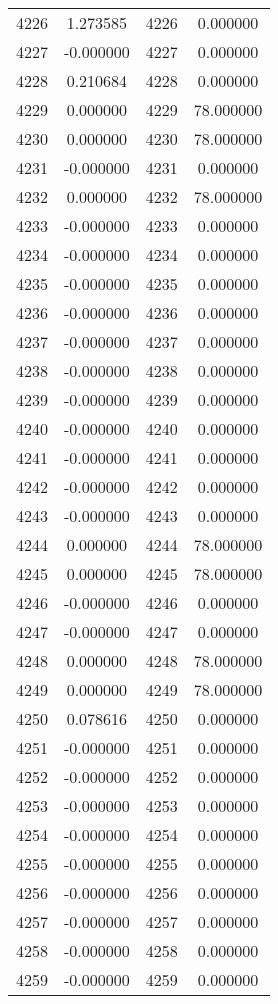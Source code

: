 \documentclass[12pt]{article}
\begin{document}
\begin{longtable}{@{}cccc@{}}
4226 & 1.273585 & 4226 & 0.000000 \\
4227 & -0.000000 & 4227 & 0.000000 \\
4228 & 0.210684 & 4228 & 0.000000 \\
4229 & 0.000000 & 4229 & 78.000000 \\
4230 & 0.000000 & 4230 & 78.000000 \\
4231 & -0.000000 & 4231 & 0.000000 \\
4232 & 0.000000 & 4232 & 78.000000 \\
4233 & -0.000000 & 4233 & 0.000000 \\
4234 & -0.000000 & 4234 & 0.000000 \\
4235 & -0.000000 & 4235 & 0.000000 \\
4236 & -0.000000 & 4236 & 0.000000 \\
4237 & -0.000000 & 4237 & 0.000000 \\
4238 & -0.000000 & 4238 & 0.000000 \\
4239 & -0.000000 & 4239 & 0.000000 \\
4240 & -0.000000 & 4240 & 0.000000 \\
4241 & -0.000000 & 4241 & 0.000000 \\
4242 & -0.000000 & 4242 & 0.000000 \\
4243 & -0.000000 & 4243 & 0.000000 \\
4244 & 0.000000 & 4244 & 78.000000 \\
4245 & 0.000000 & 4245 & 78.000000 \\
4246 & -0.000000 & 4246 & 0.000000 \\
4247 & -0.000000 & 4247 & 0.000000 \\
4248 & 0.000000 & 4248 & 78.000000 \\
4249 & 0.000000 & 4249 & 78.000000 \\
4250 & 0.078616 & 4250 & 0.000000 \\
4251 & -0.000000 & 4251 & 0.000000 \\
4252 & -0.000000 & 4252 & 0.000000 \\
4253 & -0.000000 & 4253 & 0.000000 \\
4254 & -0.000000 & 4254 & 0.000000 \\
4255 & -0.000000 & 4255 & 0.000000 \\
4256 & -0.000000 & 4256 & 0.000000 \\
4257 & -0.000000 & 4257 & 0.000000 \\
4258 & -0.000000 & 4258 & 0.000000 \\
4259 & -0.000000 & 4259 & 0.000000 \\

\end{longtable}
\end{document}

